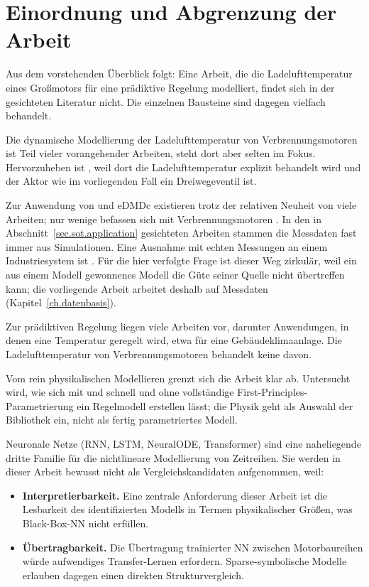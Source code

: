 \section{Einordnung und Abgrenzung der Arbeit}
\label{sec.sot.einordnung}


Aus dem vorstehenden Überblick folgt: Eine Arbeit, die die
Ladelufttemperatur eines Großmotors für eine prädiktive Regelung
modelliert, findet sich in der gesichteten Literatur nicht. Die
einzelnen Bausteine sind dagegen vielfach behandelt.

Die dynamische Modellierung der Ladelufttemperatur von
Verbrennungsmotoren ist Teil vieler vorangehender Arbeiten, steht dort
aber selten im Fokus. Hervorzuheben ist
\cite{vagapovDynamicModelTemperature2022}, weil dort die
Ladelufttemperatur explizit behandelt wird und der Aktor wie im
vorliegenden Fall ein Dreiwegeventil ist.

Zur Anwendung von \sindyc{} und eDMDc existieren trotz der relativen
Neuheit von \sindy{} viele Arbeiten; nur wenige befassen sich mit
Verbrennungsmotoren \cite{yahagiSparseIdentificationNonlinear2025}. In
den in Abschnitt~\ref{sec.sot.application} gesichteten Arbeiten stammen
die Messdaten fast immer aus Simulationen. Eine Ausnahme mit
echten Messungen an einem Industriesystem ist
\cite{yahagiGeneralizedBilinearKoopman2026}. Für die hier verfolgte
Frage ist dieser Weg zirkulär, weil ein aus einem Modell gewonnenes
Modell die Güte seiner Quelle nicht übertreffen kann; die vorliegende
Arbeit arbeitet deshalb auf Messdaten (Kapitel~\ref{ch.datenbasis}).

Zur prädiktiven Regelung liegen viele Arbeiten vor, darunter
Anwendungen, in denen eine Temperatur geregelt wird, etwa
\cite{kelmanBilinearModelPredictive2011} für eine Gebäudeklimaanlage.
Die Ladelufttemperatur von Verbrennungsmotoren behandelt keine davon.


Vom rein physikalischen Modellieren grenzt sich die Arbeit klar ab.
Untersucht wird, wie sich mit \sindy{} und \edmd{} schnell und ohne
vollständige First-Principles-Parametrierung ein Regelmodell erstellen
lässt; die Physik geht als Auswahl der Bibliothek ein, nicht als fertig
parametriertes Modell.

Neuronale Netze (RNN, LSTM, NeuralODE, Transformer) sind eine
naheliegende dritte Familie für die nichtlineare Modellierung von
Zeitreihen. Sie werden in dieser Arbeit bewusst nicht als
Vergleichskandidaten aufgenommen, weil:

\begin{itemize}
  \item \textbf{Interpretierbarkeit.} Eine zentrale Anforderung dieser
    Arbeit ist die Lesbarkeit des identifizierten Modells in Termen
    physikalischer Größen, was Black-Box-NN nicht erfüllen.
  \item \textbf{Übertragbarkeit.} Die Übertragung trainierter NN zwischen
    Motorbaureihen würde aufwendiges Transfer-Lernen erfordern.
    Sparse-symbolische Modelle erlauben dagegen einen direkten
    Strukturvergleich.
\end{itemize}


